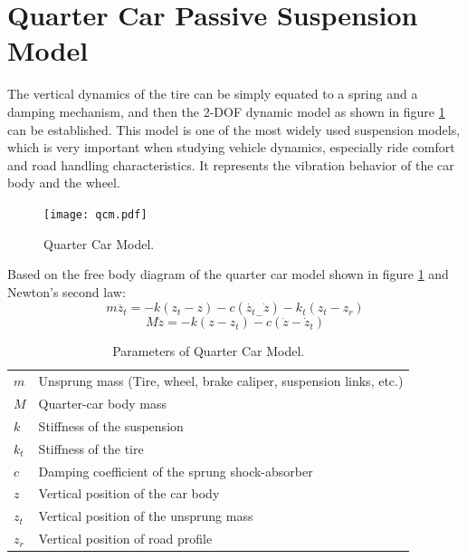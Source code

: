 
\iffalse
\section{Quarter Car Passive Suspension Model}

The vertical dynamics of the tire can be simply equated to a spring and a damping mechanism, and then the 2-DOF dynamic model as shown in figure \ref{fig:qcm} can be established.
This model is one of the most widely used suspension models, which is very important when studying vehicle dynamics, especially ride comfort and road handling characteristics. It represents the vibration behavior of the car body and the wheel. \cite{sun2020advanced}

\begin{figure}[H]
	\centering
	\texttt{[image: qcm.pdf]}
	
	\caption{Quarter Car Model\cite{researchgate_hybrid_control}.}
	\label{fig:qcm}
\end{figure}

Based on the free body diagram of the quarter car model shown in figure \ref{fig:qcm} and Newton's second law:
\begin{equation}
	m\ddot{z_t}=-k(z_t-z)-c(\dot{z_t}_-\dot{z})-k_t(z_t-z_r)
	\label{eqn:4.1}
\end{equation}
\begin{equation}
	M\ddot{z}=-k(z-z_t)-c(\dot{z}-\dot{z}_t)
	\label{eqn:4.2}
\end{equation}


\begin{table}[H]
	\centering
	\caption{Parameters of Quarter Car Model.}
	\begin{tabular}{ l|l }
		\hline
		$m$   & Unsprung mass (Tire, wheel, brake caliper, suspension links, etc.) \\
		$M$   & Quarter-car body mass                                              \\
		$k$   & Stiffness of the suspension                                        \\
		$k_t$ & Stiffness of the tire                                              \\
		$c$   & Damping coefficient of the sprung shock-absorber                   \\
		$z$   & Vertical position of the car body                                  \\
		$z_t$ & Vertical position of the unsprung mass                             \\
		$z_r$ & Vertical position of road profile                                  \\
		\hline
	\end{tabular}
	\label{table:qcm}
\end{table}


